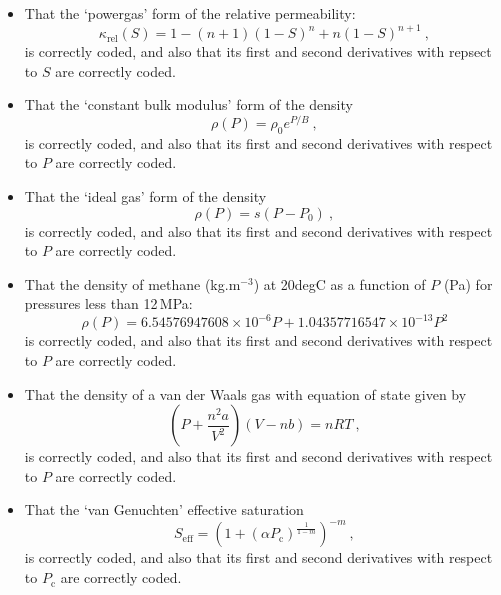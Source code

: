 \documentclass[]{scrreprt}
\begin{document}
\begin{itemize}
\item That the `powergas' form of the relative permeability:
\begin{equation}
\kappa_{\mathrm{rel}}(S) = 1 - (n+1)(1-S)^{n} + n(1-S)^{n+1} \ ,
\end{equation}
is correctly coded, and also that its first and second derivatives
with repsect to $S$ are correctly coded.


\item That the `constant bulk modulus' form of the density
\begin{equation}
\rho(P) = \rho_{0}e^{P/B} \ ,
\end{equation}
is correctly coded, and also that its first and second derivatives
with respect to $P$ are correctly coded.

\item That the `ideal gas' form of the density
\begin{equation}
\rho(P) = s(P-P_{\mathrm{0}}) \ ,
\end{equation}
is correctly coded, and also that its first and second derivatives
with respect to $P$ are correctly coded.

\item That the density of methane (kg.m$^{-3}$) at 20degC as a
  function of $P$ (Pa) for pressures less than 12\,MPa: 
\begin{equation}
\rho(P) = 6.54576947608\times 10^{-6}P + 1.04357716547\times 10^{-13} P^{2}
\end{equation}
is correctly coded, and also that its first and second derivatives
with respect to $P$ are correctly coded.

\item That the density of a van der Waals gas with equation of state given by
\begin{equation}
\left( P + \frac{n^{2}a}{V^{2}} \right)(V- nb) = nRT \ ,
\end{equation}
is correctly coded, and also that its first and second derivatives
with respect to $P$ are correctly coded.

\item That the `van Genuchten' effective saturation
\begin{equation}
S_{\mathrm{eff}} = \left(1 + (\alpha
P_{\mathrm{c}})^{\frac{1}{1-m}}\right)^{-m} \ ,
\label{eqn.vg.cap}
\end{equation}
is correctly coded, and also that its first and second derivatives
with respect to $P_{\mathrm{c}}$ are correctly coded.


\end{itemize}
\end{document}
